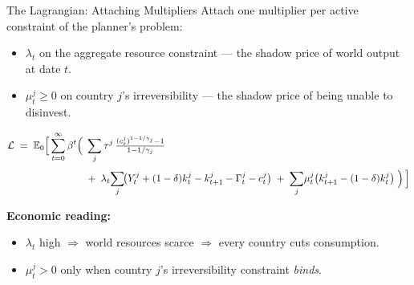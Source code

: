 \documentclass[aspectratio=169,11pt]{beamer}
\newcommand{\emphc}[1]{\textcolor{harvardcrimson}{#1}}
\begin{document}
\begin{frame}{The Lagrangian: Attaching Multipliers}
\footnotesize
Attach one multiplier per active constraint of the planner's problem:
\begin{itemize}\itemsep2pt
    \item $\lambda_t$ on the aggregate resource constraint --- the \emphc{shadow price of world output} at date $t$.
    \item $\mu_t^j \geq 0$ on country $j$'s irreversibility --- the \emphc{shadow price of being unable to disinvest}.
\end{itemize}

\[
\begin{aligned}
\mathcal{L} \;=\; \mathbb{E}_0\Bigl[\, \sum_{t=0}^{\infty} \beta^{t}\Bigl(\;
  &\sum_{j} \tau^j \,\tfrac{(c_t^j)^{1-1/\gamma_j} - 1}{1-1/\gamma_j}\\[3pt]
  &{}+\; \lambda_t\!\sum_{j}\!\bigl(Y_t^j + (1-\delta) k_t^j - k_{t+1}^j - \Gamma_t^j - c_t^j\bigr)
   \;+\; \sum_{j}\! \mu_t^j \bigl(k_{t+1}^j - (1-\delta) k_t^j\bigr)
\;\Bigr)\,\Bigr]
\end{aligned}
\]

\smallskip
\textbf{Economic reading:}
\begin{itemize}\itemsep1pt
    \item $\lambda_t$ high $\Rightarrow$ world resources scarce $\Rightarrow$ every country cuts consumption.
    \item $\mu_t^j > 0$ only when country $j$'s irreversibility constraint \emph{binds}.
\end{itemize}
\end{frame}
\end{document}
